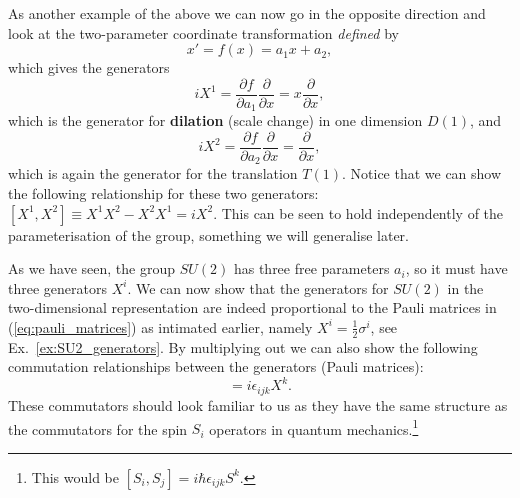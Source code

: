 \documentclass[notes.tex]{subfiles}
\begin{document}
As another example of the above we can now go in the opposite direction and look at the two-parameter coordinate transformation {\it defined} by
\[x' = f(x) = a_1x + a_2,\]
which gives the generators
\[iX^1 = \frac{\partial f}{\partial a_1} \frac{\partial}{\partial x} = x\frac{\partial}{\partial x},\]
which is the generator for {\bf dilation} (scale change) in one dimension $D(1)$, and
\[iX^2 =  \frac{\partial f}{\partial a_2} \frac{\partial}{\partial x} =\frac{\partial}{\partial x},\]
which is again the generator for the translation $T(1)$. 
Notice that we can show the following relationship for these two generators: $[X^1, X^2] \equiv X^1X^2-X^2X^1= iX^2$. This can be seen to hold independently of the parameterisation of the group, something we will generalise later.

As we have seen, the group $SU(2)$ has three free parameters $a_i$, so it must have three generators $X^i$. We can now show that the generators for $SU(2)$ in the two-dimensional representation are indeed proportional to the Pauli matrices in (\ref{eq:pauli_matrices}) as intimated earlier, namely $X^i=\frac{1}{2}\sigma^i$, see Ex.~\ref{ex:SU2_generators}. By multiplying out we can also show the following commutation relationships between the generators (Pauli matrices):
\begin{equation}
[X_i,X_j]=i\epsilon_{ijk}X^k.
\label{eq:su2_algebra}
\end{equation}
These commutators should look familiar to us as they have the same structure as the commutators for the spin $S_i$ operators in quantum mechanics.\footnote{This would be $[S_i,S_j]=i\hbar\epsilon_{ijk}S^k$.}  
\end{document}
